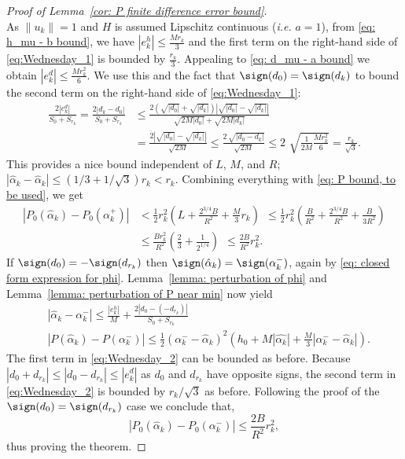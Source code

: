 \begin{proof}[Proof of Lemma~\ref{cor: P finite difference error bound}]
\begin{equation}
        \label{eq:Wednesday_1}
    \end{equation}
    As $\|u_k\|=1$ and $H$ is assumed Lipschitz continuous ({\em i.e.} $a=1$), from \eqref{eq: h_mu - b bound}, we have $|e_k^h| \leq \frac{Mr_k}{3}$ and the first term on the right-hand side of \eqref{eq:Wednesday_1} is bounded by $\frac{r_k}{3}$. Appealing to \eqref{eq: d_mu - a bound} we obtain $|e_k^d| \leq \frac{Mr_k^2}{6}$. We use this and the fact that $\sign(d_0) = \sign(d_k)$ to bound the second term on the right-hand side of \eqref{eq:Wednesday_1}:
    \begin{align*}
        \frac{2|e_k^d|}{S_0 + S_{r_k}} = \frac{2 |d_k - d_0|}{S_{0}+S_{r_k}}
         & \leq \frac{2\left(\sqrt{|d_0|} + \sqrt{|d_{k}|}\right) \left|\sqrt{|d_0|}-\sqrt{|d_{k}|}\right|}{\sqrt{2M|d_0|} + \sqrt{2M|d_{k}|}} \\
         & = \frac{2\left|\sqrt{|d_0|}-\sqrt{|d_{k}|}\right|}{\sqrt{2M}} \leq
        \frac{2\, \sqrt{|d_0 - d_{k}|}}{\sqrt{2M}}
        \leq 2\,\,\sqrt{\frac{1}{2M}\frac{Mr_k^2}{6}}
        = \frac{r_k}{\sqrt{3}} .
    \end{align*}
    This provides a nice bound independent of $L$, $M$, and $R$; $ |\hat{\alpha}_k - \hat{\alpha}_k| \leq (1/3 + 1/\sqrt{3}) r_k < r_k.$  Combining everything with \eqref{eq: P bound, to be used}, we get
    \begin{align*}
        \left| P_0(\hat{\alpha}_k) - P_0(\alpha^{+}_k) \right|
         & < \frac{1}{2}r_k^2\left( L + \frac{2^{3/4} B}{R^2} + \frac{M}{3}r_k\right)
        ~~\leq \frac{1}{2}r_k^2\left(\frac{B}{R^2} + \frac{2^{3/4} B}{R^2} + \frac{B}{3R^2} \right) \\
         & \leq \frac{Br_k^2}{R^2}\left(\frac{2}{3} + \frac{1}{2^{1/4}}\right)
        ~~\leq \frac{2B}{R^2}r_k^2.
    \end{align*}
    If $\sign(d_0) = -\sign(d_{r_k})$ then $\sign(\hat{\alpha}_k) = \sign(\alpha^{-}_k)$, again by \eqref{eq: closed form expression for phi}. Lemma~\ref{lemma: perturbation of phi} and Lemma~\ref{lemma: perturbation of P near min} now yield
    \begin{align}
         & |\hat{\alpha}_k - \alpha_k^-| \leq \frac{|e_k^h|}{M} + \frac{2|d_0 - (-d_{r_k})|}{S_0 + S_{r_k}} \label{eq:Wednesday_2} \\
         & |P(\hat{\alpha}_k) - P(\alpha_k^-)| \leq
        \frac{1}{2}(\alpha_k^- - \hat{\alpha}_k)^2\left(h_0 + M |\hat{\alpha_k}| + \frac{M}{3}|\alpha_k^- - \hat{\alpha}_k|\right). \nonumber
    \end{align}
    The first term in \eqref{eq:Wednesday_2} can be bounded as before. Because $|d_0 + d_{r_k}| \leq |d_0 - d_{r_k}|\leq |e^d_k|$ as $d_0$ and $d_{r_k}$ have opposite signs, the second term in \eqref{eq:Wednesday_2} is bounded by $r_{k}/\sqrt{3}$ as before. Following the proof of the $\sign(d_0) = \sign(d_{r_k})$ case we conclude that,
    \begin{equation*}
        \left| P_0(\hat{\alpha}_k) - P_0(\alpha^{-}_k) \right| \leq \frac{2B}{R^2}r_k^2,
    \end{equation*}
    thus proving the theorem.
\end{proof}

